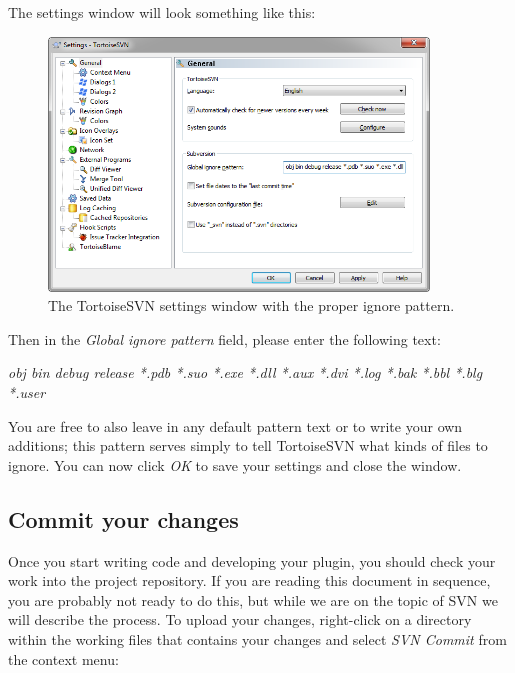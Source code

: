 \noindent The settings window will look something like this:

\begin{figure}[h!]
	\centering
		\includegraphics[width=0.90\textwidth]{figures/tortoise_svn_ignore_patterns.png}
	\caption{The TortoiseSVN settings window with the proper ignore pattern.}
	\label{fig:tortoise_svn_ignore_patterns}
\end{figure}

\noindent Then in the \textit{Global ignore pattern} field, please enter the following text:

\begin{center}
\textit{obj bin debug release *.pdb *.suo *.exe *.dll *.aux *.dvi *.log *.bak *.bbl *.blg *.user}
\end{center}

You are free to also leave in any default pattern text or to write your own additions; this pattern serves simply to tell TortoiseSVN what kinds of files to ignore. You can now click \textit{OK} to save your settings and close the window.
\clearpage

\subsection{Commit your changes}
\label{CommitingYourChanges}

Once you start writing code and developing your plugin, you should check your work into the project repository. If you are reading this document in sequence, you are probably not ready to do this, but while we are on the topic of SVN we will describe the process. To upload your changes, right-click on a directory within the working files that contains your changes and select \textit{SVN Commit} from the context menu:

